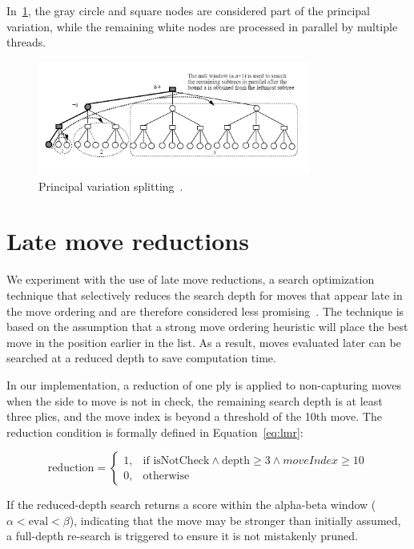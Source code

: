 \vspace{1em}

\noindent In~\cref{fig:pvsplitting}, the gray circle and square nodes are considered part of the principal variation, while the remaining white nodes are processed in parallel by multiple threads.

\begin{figure}
   \centering
   \includegraphics[width=0.8\textwidth]{Imagenes/Bitmap/pvsplitting.png}
   \caption{Principal variation splitting~\cite{PVSplitting}.}\label{fig:pvsplitting}
\end{figure}

\newpage
\section{Late move reductions}

\noindent We experiment with the use of late move reductions, a search optimization technique that selectively reduces the search depth for moves that appear late in the move ordering and are therefore considered less promising~\cite{LateMoveReductions}. The technique is based on the assumption that a strong move ordering heuristic will place the best move in the position earlier in the list. As a result, moves evaluated later can be searched at a reduced depth to save computation time.

\vspace{1em}

\par
In our implementation, a reduction of one ply is applied to non-capturing moves when the side to move is not in check, the remaining search depth is at least three plies, and the move index is beyond a threshold of the 10th move. The reduction condition is formally defined in Equation~\ref{eq:lmr}:

\vspace{1em}

\begin{equation}
\text{reduction} = 
\begin{cases}
1, & \text{if } \text{isNotCheck} \wedge \text{depth} \geq 3 \wedge moveIndex \geq 10 \\
0, & \text{otherwise}
\end{cases}
\label{eq:lmr}
\end{equation}

\vspace{1em}

\par
If the reduced-depth search returns a score within the alpha-beta window ($\alpha < \text{eval} < \beta$), indicating that the move may be stronger than initially assumed, a full-depth re-search is triggered to ensure it is not mistakenly pruned.


